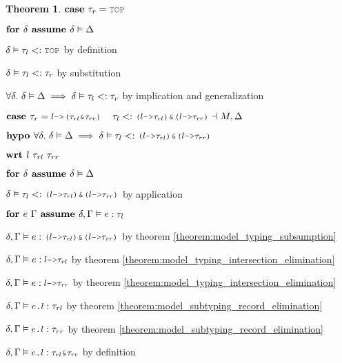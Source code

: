 \documentclass[acmsmall]{acmart}
\theoremstyle{definition}
\newtheorem{theorem}{Theorem}[section]
\begin{document}
\begin{theorem}
    \item \Z $\B{case } \tau_r = \J{TOP}$
      \item \Z\Z $\textbf{for } \delta \textbf{ assume } \delta \vDash \Delta$
        \item \Z\Z\Z $\delta \satisfies \tau_l \subtypes \J{TOP}$ by definition
        \item \Z\Z\Z $\delta \vDash \tau_l <: \tau_r$ by substitution 
      \item \Z\Z $\forall \delta .\ \delta \vDash \Delta \implies \delta \vDash \tau_l <: \tau_r$ 
      by implication and generalization 

    \item \Z $\B{case } 
      \tau_r = \J{$l$->($\tau_{rl}$\&$\tau_{rr}$)}
      \I
      \tau_l
      \subtypes
      \J{($l$->$\tau_{rl}$)\&($l$->$\tau_{rr}$)}
      \given M, \Delta
    $
    \item \Z $\B{hypo }
      \forall \delta .\ 
      \delta \satisfies \Delta
      \implies
      \delta \satisfies \tau_l \subtypes \J{($l$->$\tau_{rl}$)\&($l$->$\tau_{rr}$)}
    $ 
    \item \Z $\B{wrt } l\ \tau_{rl}\ \tau_{rr}$ 
      \item \Z\Z $\textbf{for } \delta \textbf{ assume } \delta \vDash \Delta$
        \item \Z\Z\Z $\delta \satisfies \tau_l \subtypes \J{($l$->$\tau_{rl}$)\&($l$->$\tau_{rr}$)}$
        by application
        \item \Z\Z\Z $\textbf{for } e\ \Gamma \textbf{ assume } \delta, \Gamma \vDash e : \tau_l$ 
          \item \Z\Z\Z\Z $\delta, \Gamma \satisfies e \hastype \J{($l$->$\tau_{rl}$)\&($l$->$\tau_{rr}$)}$
          by theorem \ref{theorem:model_typing_subsumption} 
          \item \Z\Z\Z\Z $\delta, \Gamma \satisfies e \hastype \J{$l$->$\tau_{rl}$}$ by theorem \ref{theorem:model_typing_intersection_elimination}
          \item \Z\Z\Z\Z $\delta, \Gamma \satisfies e \hastype \J{$l$->$\tau_{rr}$}$ by theorem \ref{theorem:model_typing_intersection_elimination}
          \item \Z\Z\Z\Z $\delta, \Gamma \satisfies \J{$e$.$l$} \hastype \tau_{rl}$ by theorem \ref{theorem:model_subtyping_record_elimination}
          \item \Z\Z\Z\Z $\delta, \Gamma \satisfies \J{$e$.$l$} \hastype \tau_{rr}$ by theorem \ref{theorem:model_subtyping_record_elimination}
          \item \Z\Z\Z\Z $\delta, \Gamma \satisfies \J{$e$.$l$} \hastype \J{$\tau_{rl}$\&$\tau_{rr}$}$ by definition

\end{theorem}
\end{document}
